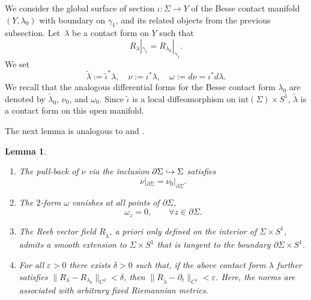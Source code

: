 \documentclass[JEP,XML,SOM,Unicode,published]{cedram}
\let\epsilon\varepsilon
\newenvironment{enumeratei}
{\bgroup\def\theenumi{\roman{enumi}}\def\theenumii{\arabic{enumii}}\begin{enumerate}}
{\end{enumerate}\egroup}
\newcommand\hto{\mathrel{\lhook\joinrel\to}}
\newtheorem{lem}[thm]{Lemma}
\theoremstyle{definition}
\begin{document}
We consider the global surface of section $\iota:\Sigma\to Y$ of the Besse contact manifold $(Y,\lambda_0)$ with boundary on $\gamma_1$, and its related objects from the previous subsection.
Let~$\lambda$ be a contact form on $Y$ such that
\begin{equation}
\label{e:same_Reeb_on_gamma_1}
R_{\lambda}|_{\gamma_1}=R_{\lambda_0}|_{\gamma_1}.
\end{equation}
We set
\[
\tilde{\lambda} := \tilde\iota^* \lambda, \quad \nu := \iota^* \lambda, \quad \omega := d\nu = \iota^* d\lambda.
\]
We recall that the analogous differential forms for the Besse contact form $\lambda_0$ are denoted by $\tilde\lambda_0$, $\nu_0$, and $\omega_0$. Since $\tilde\iota$ is a local diffeomorphism on $\mathrm{int}(\Sigma) \times S^1$, $\tilde{\lambda}$ is a contact form on this open manifold.

The next lemma is analogous to \cite[Prop.\,3.6]{Abbondandolo:2018fb} and \cite[Prop.\,3.10]{Benedetti:2021aa}.

\skpt
\begin{lem}\label{l:nearly_Besse_normalized}
\begin{enumeratei}

\item\label{l:nearly_Besse_normalizedi}
The pull-back of $\nu$ via the inclusion $\partial\Sigma\hto\Sigma$ satisfies
\[
\nu|_{\partial\Sigma}=\nu_0|_{\partial\Sigma}.
\]

\item\label{l:nearly_Besse_normalizedii}
The $2$-form $\omega$ vanishes at all points of $\partial\Sigma$, \ie
\[
\omega_z= 0,\qquad \forall z\in \partial\Sigma.
\]

\item\label{l:nearly_Besse_normalizediii}
The Reeb vector field $R_{\tilde\lambda}$, a priori only defined on the interior of $\Sigma\times S^1$, admits a smooth extension to $\Sigma\times S^1$ that is tangent to the boundary $\partial \Sigma\times S^1$.

\item\label{l:nearly_Besse_normalizediv}
For all $\epsilon>0$ there exists $\delta>0$ such that, if the above contact form $\lambda$ further satisfies $\|R_\lambda-R_{\lambda_0}\|_{C^2}<\delta$, then $\|R_{\tilde\lambda}-\partial_t\|_{C^1}<\epsilon$. Here, the norms are associated with arbitrary fixed Riemannian metrics.
\end{enumeratei}
\end{lem}
\end{document}
